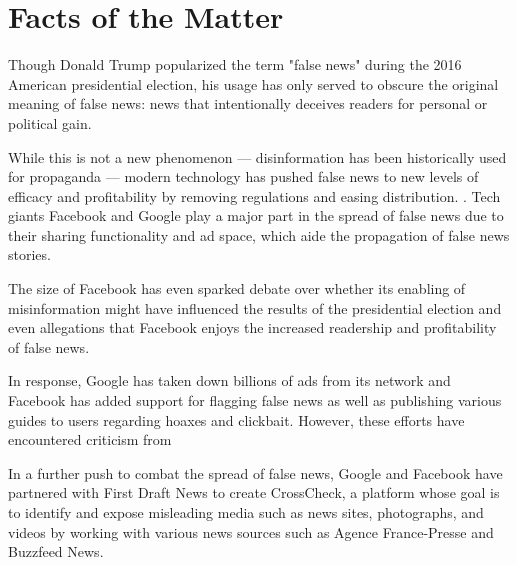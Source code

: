

\section{Facts of the Matter}

%
%
%

Though Donald Trump popularized the term "false news" during the 2016 American presidential election, \cite{tc_what_is_fake_news} his usage has only served to obscure the original meaning of false news: news that intentionally deceives readers for personal or political gain. \cite{tc_what_is_fake_news, npr_fake_news}

While this is not a new phenomenon --- disinformation has been historically used for propaganda \cite{bbc_fn_propaganda} --- modern technology has pushed false news to new levels of efficacy and profitability by removing regulations and easing distribution. \cite{telegraph_fake_news}. Tech giants Facebook and Google play a major part in the spread of false news due to their sharing functionality and ad space, which aide the propagation of false news stories. \cite{cbs_fake_news, tc_google_took_down_ads}

The size of Facebook has even sparked debate over whether its enabling of misinformation might have influenced the results of the presidential election \cite{bbc_facebook_fake_news_crisis, wp_russian_election_propaganda} and even allegations that Facebook enjoys the increased readership and profitability of false news. \cite{tc_facebook_responsibility}

In response, Google has taken down billions of ads from its network \cite{tc_google_took_down_ads} and Facebook has added support for flagging false news as well as publishing various guides to users regarding hoaxes and clickbait. \cite{tc_fb_down_ranks_fake_news,fb_reduce_clickbait,fb_addressing_hoaxes,fb_spot_fake_news} However, these efforts have encountered criticism from  

In a further push to combat the spread of false news, Google and Facebook have partnered with First Draft News to create CrossCheck, \cite{crosscheck_launch} a platform whose goal is to identify and expose misleading media such as news sites, photographs, and videos by working with various news sources such as Agence France-Presse and Buzzfeed News. \cite{tc_google_fb_partner,pcw_france_google_facebook}